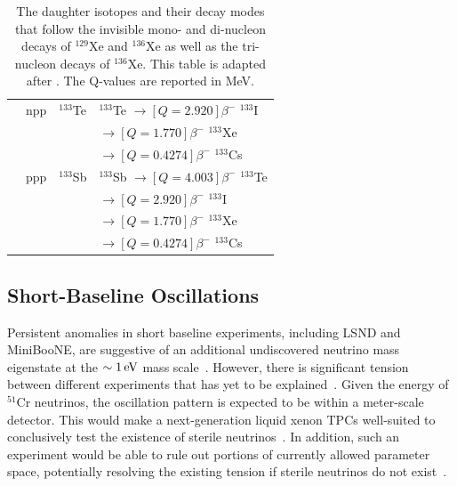 \begin{table}[!htbp]
\begin{tabular}{lcll}
           & npp & $^{133}$Te & $^{133}$Te $\rightarrow[Q = 2.920]{\text{$\beta^{-}$}}$ $^{133}$I \\
           &     &            & \phantom{$^{133}$Te} $\rightarrow[Q = 1.770]{\text{$\beta^{-}$}}$ $^{133}$Xe \\
           &     &            & \phantom{$^{133}$Te} $\rightarrow[Q = 0.4274]{\text{$\beta^{-}$}}$ $^{133}$Cs \\
           & ppp & $^{133}$Sb & $^{133}$Sb $\rightarrow[Q = 4.003]{\text{$\beta^{-}$}}$ $^{133}$Te \\
           &     &            & \phantom{$^{133}$Sb} $\rightarrow[Q = 2.920]{\text{$\beta^{-}$}}$ $^{133}$I \\
           &     &            & \phantom{$^{133}$Sb} $\rightarrow[Q = 1.770]{\text{$\beta^{-}$}}$ $^{133}$Xe \\
           &     &            & \phantom{$^{133}$Sb} $\rightarrow[Q = 0.4274]{\text{$\beta^{-}$}}$ $^{133}$Cs \\
\end{tabular}
\caption{The daughter isotopes and their decay modes that follow the invisible mono- and di-nucleon decays of $^{129}$Xe and $^{136}$Xe as well as the tri-nucleon decays of $^{136}$Xe. This table is adapted after \cite{Bernabei:2000xp,Bernabei:2006tw}. The Q-values are reported in MeV.}
\label{tab_Xe}
\normalsize
\end{table}

\subsection{Short-Baseline Oscillations}\label{sec:shortbaseline}

Persistent anomalies in short baseline experiments, including LSND and MiniBooNE, are suggestive of an additional undiscovered neutrino mass eigenstate at the $\sim1\, \mathrm{eV}$ mass scale~\cite{Abazajian:2017tcc}. However, there is significant tension between different experiments that has yet to be explained~\cite{Diaz:2019fwt}. Given the energy of $^{51}$Cr neutrinos, the oscillation pattern is expected to be within a meter-scale detector. This would make a next-generation liquid xenon TPCs well-suited to conclusively test the existence of sterile neutrinos~\cite{Coloma:2014hka}. In addition, such an experiment would be able to rule out portions of currently allowed parameter space, potentially resolving the existing tension if sterile neutrinos do not exist~\cite{Coloma:2014hka}.



